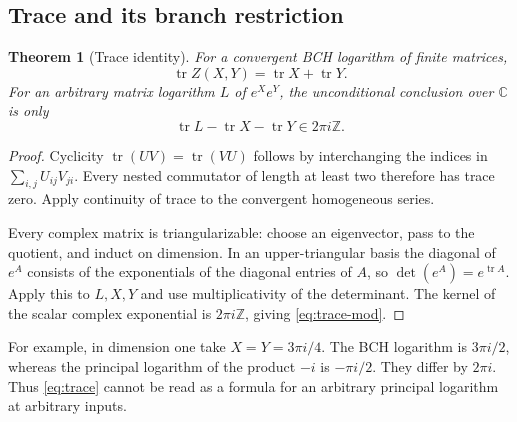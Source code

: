 \documentclass[11pt]{article}
\newtheorem{theorem}{Theorem}[section]
\theoremstyle{definition}
\theoremstyle{remark}
\newcommand{\C}{\mathbb C}
\newcommand{\tr}{\operatorname{tr}}
\numberwithin{equation}{section}
\begin{document}
\subsection{Trace and its branch restriction}
\begin{theorem}[Trace identity]\label{thm:trace}
For a convergent BCH logarithm of finite matrices,
\begin{equation}\label{eq:trace}
 \tr Z(X,Y)=\tr X+\tr Y.
\end{equation}
For an arbitrary matrix logarithm $L$ of $e^Xe^Y$, the unconditional conclusion over $\C$ is only
\begin{equation}\label{eq:trace-mod}
 \tr L-\tr X-\tr Y\in2\pi i\mathbb Z.
\end{equation}
\end{theorem}
\begin{proof}
Cyclicity $\tr(UV)=\tr(VU)$ follows by interchanging the indices in
$\sum_{i,j}U_{ij}V_{ji}$. Every nested commutator of length at least two therefore has trace zero. Apply continuity of trace to the convergent homogeneous series.

Every complex matrix is triangularizable: choose an eigenvector, pass to the quotient, and induct on dimension. In an upper-triangular basis the diagonal of $e^A$ consists of the exponentials of the diagonal entries of $A$, so $\det(e^A)=e^{\tr A}$. Apply this to $L,X,Y$ and use multiplicativity of the determinant. The kernel of the scalar complex exponential is $2\pi i\mathbb Z$, giving \eqref{eq:trace-mod}.
\end{proof}
For example, in dimension one take $X=Y=3\pi i/4$. The BCH logarithm is $3\pi i/2$, whereas the principal logarithm of the product $-i$ is $-\pi i/2$. They differ by $2\pi i$. Thus \eqref{eq:trace} cannot be read as a formula for an arbitrary principal logarithm at arbitrary inputs.
\end{document}
